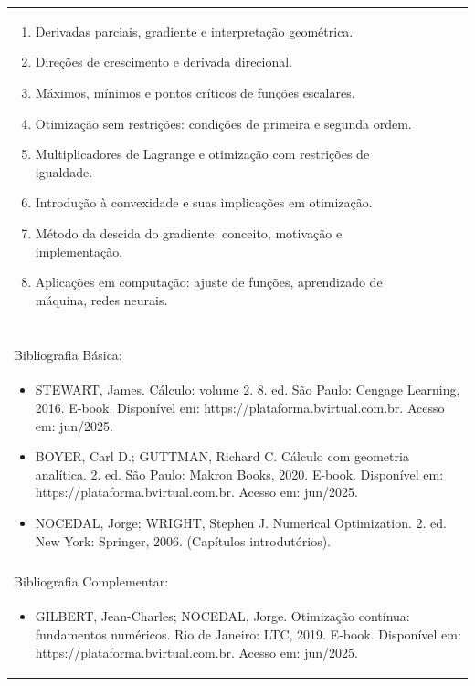 \documentclass[11pt]{article}
\begin{document}
\begin{center}
\begin{longtable}{|p{4cm}|p{4cm}|p{4cm}|p{4cm}|}
{\begin{enumerate}
\item Derivadas parciais, gradiente e interpretação geométrica.
\item Direções de crescimento e derivada direcional.
\item Máximos, mínimos e pontos críticos de funções escalares.
\item Otimização sem restrições: condições de primeira e segunda ordem.
\item Multiplicadores de Lagrange e otimização com restrições de igualdade.
\item Introdução à convexidade e suas implicações em otimização.
\item Método da descida do gradiente: conceito, motivação e implementação.
\item Aplicações em computação: ajuste de funções, aprendizado de máquina, redes neurais.\end{enumerate}}\\
\multicolumn{4}{|p{16cm}|}{}\\
\multicolumn{4}{|p{16cm}|}{}\\
\multicolumn{4}{|p{16cm}|}{\vspace{-1cm}}\\
\multicolumn{4}{|p{16cm}|}{}\\
\hline
\multicolumn{4}{|p{16cm}|}{Bibliografia Básica:}\\
\multicolumn{4}{|p{16cm}|}{%
\begin{itemize}\item STEWART, James. Cálculo: volume 2. 8. ed. São Paulo: Cengage Learning, 2016. E-book. Disponível em: https://plataforma.bvirtual.com.br. Acesso em: jun/2025.
\item BOYER, Carl D.; GUTTMAN, Richard C. Cálculo com geometria analítica. 2. ed. São Paulo: Makron Books, 2020. E-book. Disponível em: https://plataforma.bvirtual.com.br. Acesso em: jun/2025.
\item NOCEDAL, Jorge; WRIGHT, Stephen J. Numerical Optimization. 2. ed. New York: Springer, 2006. (Capítulos introdutórios).\end{itemize}}\\
\multicolumn{4}{|p{16cm}|}{}\\
\hline
\multicolumn{4}{|p{16cm}|}{Bibliografia Complementar:}\\
\multicolumn{4}{|p{16cm}|}{%
\begin{itemize}\item GILBERT, Jean-Charles; NOCEDAL, Jorge. Otimização contínua: fundamentos numéricos. Rio de Janeiro: LTC, 2019. E-book. Disponível em: https://plataforma.bvirtual.com.br. Acesso em: jun/2025.

\end{itemize}}
\end{longtable}
\end{center}
\end{document}
